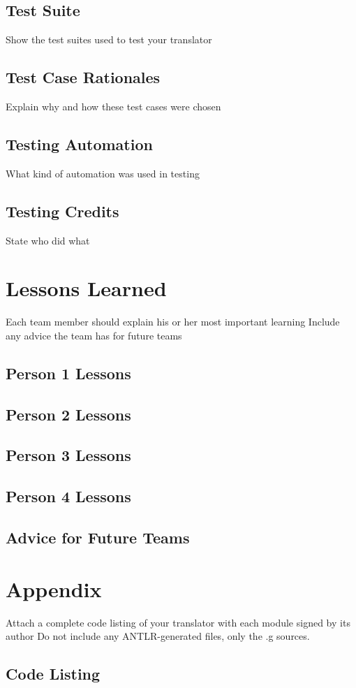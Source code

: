 \documentclass[12pt]{book}
\begin{document}
	\section{Test Suite}
		Show the test suites used to test your translator
	\section{Test Case Rationales}
		Explain why and how these test cases were chosen
	\section{Testing Automation}
		What kind of automation was used in testing
	\section{Testing Credits}
		State who did what

\chapter{Lessons Learned}
	Each team member should explain his or her most important learning
	Include any advice the team has for future teams
	\section{Person 1 Lessons}
	\section{Person 2 Lessons}
	\section{Person 3 Lessons}
	\section{Person 4 Lessons}
	\section{Advice for Future Teams}
\backmatter
\chapter{Appendix}
	Attach a complete code listing of your translator with each module signed by its author
	Do not include any ANTLR-generated files, only the .g sources.
	\section{Code Listing}
\end{document}
